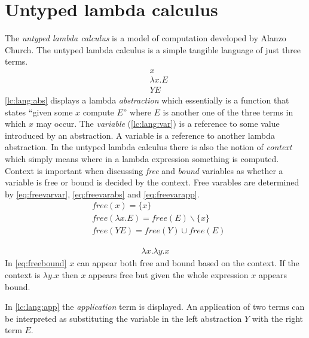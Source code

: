 \clearpage
\section{Untyped lambda calculus}\label{sec:lc}
The \textit{untyped lambda calculus} is a model of computation developed by Alanzo Church\cite{church1936unsolvable}.
The untyped lambda calculus is a simple tangible language of just three terms.
\begin{align}
  &x
  \label{lc:lang:var}\\
  &\lambda x . E
  \label{lc:lang:abs}\\
  &Y E
  \label{lc:lang:app}
\end{align}
\autoref{lc:lang:abs} displays a lambda \textit{abstraction} which essentially is a function that states ``given some $x$ compute $E$'' where $E$ is another one of the three terms in which $x$ may occur.
The \textit{variable} (\autoref{lc:lang:var}) is a reference to some value introduced by an abstraction.
A variable is a reference to another lambda abstraction.
In the untyped lambda calculus there is also the notion of \textit{context} which simply means where in a lambda expression something is computed.
Context is important when discussing \textit{free} and \textit{bound} variables as whether a variable is free or bound is decided by the context.
Free varables are determined by \autoref{eq:freevarvar}, \autoref{eq:freevarabs} and \autoref{eq:freevarapp}.
\begin{align}
    \label{eq:freevarvar}
    &\textit{free}(x) = \{ x \}\\
    \label{eq:freevarabs}
    &\textit{free}(\lambda x . E) = \textit{free}(E) \backslash \{ x \}\\
    \label{eq:freevarapp}
    &\textit{free}(Y E) = \textit{free}(Y) \cup \textit{free}(E)
\end{align}
\begin{exmp}
    \begin{align}
        \lambda x . \lambda y . x\label{eq:freebound}
    \end{align}
    In \autoref{eq:freebound} $x$ can appear both free and bound based on the context.
    If the context is $\lambda y . x$ then $x$ appears free but given the whole expression $x$ appears bound.
\end{exmp}

In \autoref{lc:lang:app} the \textit{application} term is displayed.
An application of two terms can be interpreted as substituting the variable in the left abstraction $Y$ with the right term $E$.

